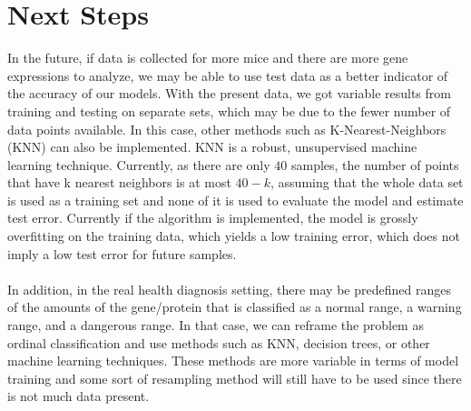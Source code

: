 \documentclass{article}
\begin{document}
\section{Next Steps}
In the future, if data is collected for more mice and there are more gene expressions to analyze, we may be able to use test data as a better indicator of the accuracy of our models. With the present data, we got variable results from training and testing on separate sets, which may be due to the fewer number of data points available. In this case, other methods such as K-Nearest-Neighbors (KNN) can also be implemented. KNN is a robust, unsupervised machine learning technique.  Currently, as there are only $40$ samples, the number of points that have k nearest neighbors is at most $40-k$, assuming that the whole data set is used as a training set and none of it is used to evaluate the model and estimate test error.  Currently if the algorithm is implemented, the model is grossly overfitting on the training data, which yields a low training error, which does not imply a low test error for future samples.\\
\null\\
In addition, in the real health diagnosis setting, there may be predefined ranges of the amounts of the gene/protein that is classified as a normal range, a warning range, and a dangerous range.  In that case, we can reframe the problem as ordinal classification and use methods such as KNN, decision trees, or other machine learning techniques.  These methods are more variable in terms of model training and some sort of resampling method will still have to be used since there is not much data present. 
\end{document}
